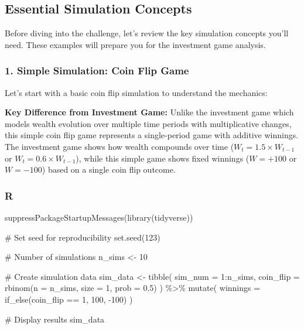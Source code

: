 \documentclass[
  letterpaper,
  DIV=11,
  numbers=noendperiod]{scrartcl}
\newenvironment{Shaded}{\begin{snugshade}}{\end{snugshade}}
\newcommand{\AttributeTok}[1]{\textcolor[rgb]{0.40,0.45,0.13}{#1}}
\newcommand{\CommentTok}[1]{\textcolor[rgb]{0.37,0.37,0.37}{#1}}
\newcommand{\DecValTok}[1]{\textcolor[rgb]{0.68,0.00,0.00}{#1}}
\newcommand{\FloatTok}[1]{\textcolor[rgb]{0.68,0.00,0.00}{#1}}
\newcommand{\FunctionTok}[1]{\textcolor[rgb]{0.28,0.35,0.67}{#1}}
\newcommand{\NormalTok}[1]{\textcolor[rgb]{0.00,0.23,0.31}{#1}}
\newcommand{\OtherTok}[1]{\textcolor[rgb]{0.00,0.23,0.31}{#1}}
\newcommand{\SpecialCharTok}[1]{\textcolor[rgb]{0.37,0.37,0.37}{#1}}
\theoremstyle{definition}
\theoremstyle{remark}
\begin{document}
\subsection{Essential Simulation Concepts
🎯}\label{sec-simulation-concepts}

Before diving into the challenge, let's review the key simulation
concepts you'll need. These examples will prepare you for the investment
game analysis.

\subsubsection{1. Simple Simulation: Coin Flip
Game}\label{simple-simulation-coin-flip-game}

Let's start with a basic coin flip simulation to understand the
mechanics:

\textbf{Key Difference from Investment Game:} Unlike the investment game
which models wealth evolution over multiple time periods with
multiplicative changes, this simple coin flip game represents a
single-period game with additive winnings. The investment game shows how
wealth compounds over time (\(W_t = 1.5 \times W_{t-1}\) or
\(W_t = 0.6 \times W_{t-1}\)), while this simple game shows fixed
winnings (\(W = +100\) or \(W = -100\)) based on a single coin flip
outcome.

\subsubsection{R}

\begin{Shaded}
\begin{Highlighting}[]
\FunctionTok{suppressPackageStartupMessages}\NormalTok{(}\FunctionTok{library}\NormalTok{(tidyverse))}

\CommentTok{\# Set seed for reproducibility}
\FunctionTok{set.seed}\NormalTok{(}\DecValTok{123}\NormalTok{)}

\CommentTok{\# Number of simulations}
\NormalTok{n\_sims }\OtherTok{\textless{}{-}} \DecValTok{10}

\CommentTok{\# Create simulation data}
\NormalTok{sim\_data }\OtherTok{\textless{}{-}} \FunctionTok{tibble}\NormalTok{(}
  \AttributeTok{sim\_num =} \DecValTok{1}\SpecialCharTok{:}\NormalTok{n\_sims,}
  \AttributeTok{coin\_flip =} \FunctionTok{rbinom}\NormalTok{(}\AttributeTok{n =}\NormalTok{ n\_sims, }\AttributeTok{size =} \DecValTok{1}\NormalTok{, }\AttributeTok{prob =} \FloatTok{0.5}\NormalTok{)}
\NormalTok{) }\SpecialCharTok{\%\textgreater{}\%}
  \FunctionTok{mutate}\NormalTok{(}
    \AttributeTok{winnings =} \FunctionTok{if\_else}\NormalTok{(coin\_flip }\SpecialCharTok{==} \DecValTok{1}\NormalTok{, }\DecValTok{100}\NormalTok{, }\SpecialCharTok{{-}}\DecValTok{100}\NormalTok{)}
\NormalTok{  )}

\CommentTok{\# Display results}
\NormalTok{sim\_data}
\end{Highlighting}
\end{Shaded}
\end{document}
